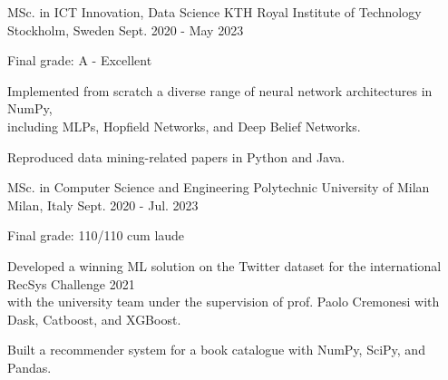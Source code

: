

\begin{cventries}
  
  
  \cventry
    {MSc. in ICT Innovation, Data Science }
    {KTH Royal Institute of Technology}
    {Stockholm, Sweden}
    {Sept. 2020 - May 2023}
    {
    \begin{cvitems} %
        \item {Final grade: A - Excellent}
        \item {Implemented from scratch a diverse range of neural network architectures in NumPy,\\ including MLPs, Hopfield Networks, and Deep Belief Networks.}
        \item {Reproduced data mining-related papers in Python and Java.}
      \end{cvitems}
    }
  
  
  
  
  \cventry
    {MSc. in Computer Science and Engineering }
    {Polytechnic University of Milan}
    {Milan, Italy}
    {Sept. 2020 - Jul. 2023}
    {
    \begin{cvitems} %
        \item {Final grade: 110/110 cum laude}
        \item {Developed a winning ML solution on the Twitter dataset for the international RecSys Challenge 2021\\with the university team under the supervision of prof. Paolo Cremonesi with Dask, Catboost, and XGBoost.}
        \item {Built a recommender system for a book catalogue with NumPy, SciPy, and Pandas.}
      \end{cvitems}
      }
  

\end{cventries}

